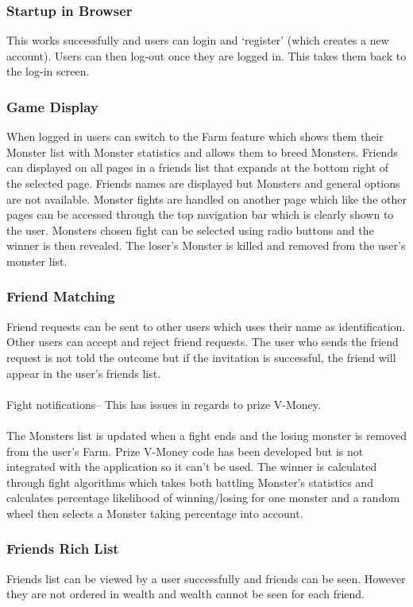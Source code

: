 \documentclass[titlepage]{article}
\begin{document}
{\subsubsection{Startup in Browser}
This works successfully and users can login and ‘register’ (which creates a new account). Users can then log-out once they are logged in. This takes them back to the log-in screen.

\subsubsection{Game Display}
When logged in users can switch to the Farm feature which shows them their Monster list with Monster statistics and allows them to breed Monsters. Friends can displayed on all pages in a friends list that expands at the bottom right of the selected page. Friends names are displayed but Monsters and general options are not available.
Monster fights are handled on another page which like the other pages can be accessed through the top navigation bar which is clearly shown to the user. Monsters chosen fight can be selected using radio buttons and the winner is then revealed. The loser's Monster is killed and removed from the user’s monster list.

\subsubsection{Friend Matching}
Friend requests can be sent to other users which uses their name as identification. Other users can accept and reject friend requests. The user who sends the friend request is not told the outcome but if the invitation is successful, the friend will appear in the user's friends list.
\\
\\
Fight notifications– This has issues in regards to prize V-Money.
\\
\\
The Monsters list is updated when a fight ends and the losing monster is removed from the user's Farm. Prize V-Money code has been developed but is not integrated with the application so it can't be used. The winner is calculated through fight algorithms which takes both battling Monster's statistics and calculates percentage likelihood of winning/losing for one monster and a random wheel then selects a Monster taking percentage into account.

\subsubsection{Friends Rich List}
Friends list can be viewed by a user successfully and friends can be seen. However they are not ordered in wealth and wealth cannot be seen for each friend.

}
\end{document}
